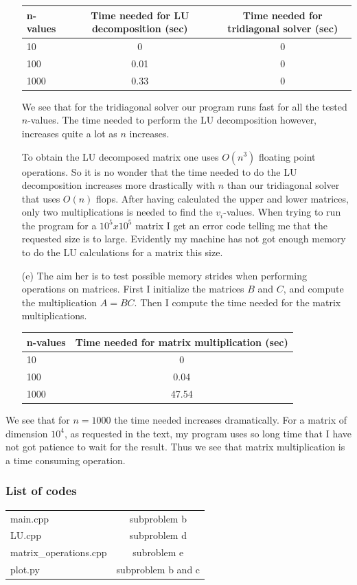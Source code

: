 \documentclass[a4paper,12pt, english]{article}
\begin{document}
\begin{enumerate}
\begin{center}
\begin{tabular}{l | c | c}
n-values & Time needed for LU decomposition (sec) & Time needed for tridiagonal solver (sec) \\ \hline 
10 & 0 & 0 \\ 
100 & 0.01 & 0 \\
1000 & 0.33 & 0 \\
\end{tabular}
\end{center}

We see that for the tridiagonal solver our program runs fast for all the tested $n$-values. The time needed to perform the LU decomposition however, increases quite a lot as $n$ increases. 

To obtain the LU decomposed matrix one uses $O(n^3)$ floating point operations. So it is no wonder that the time needed to do the LU decomposition increases more drastically with $n$ than our tridiagonal solver that uses $O(n)$ flops. After having calculated the upper and lower matrices, only two multiplications is needed to find the $v_{i}$-values. When trying to run the program for a $10^5 x 10^5$ matrix I get an error code telling me that the requested size is to large. Evidently my machine has not got enough memory to do the LU calculations for a matrix this size. 

\item[(e)]
The aim her is to test possible memory strides when performing operations on matrices. First I initialize the matrices $B$ and $C$, and compute the multiplication $A = BC$. Then I compute the time needed for the matrix multiplications.

\begin{center}
\begin{tabular}{l | c}
n-values & Time needed for matrix multiplication (sec) \\ \hline 
10 & 0\\ 
100 & 0.04\\
1000 & 47.54 \\
\end{tabular}
\end{center}
\end{enumerate}


We see that for $n=1000$ the time needed increases dramatically. For a matrix of dimension $10^4$, as requested in the text, my program uses so long time that I have not got patience to wait for the result. Thus we see that matrix multiplication is a time consuming operation. 

\subsubsection*{List of codes}
\begin{center}
\begin{tabular}{l  c}
main.cpp & subproblem b \\
LU.cpp & subproblem d \\
matrix\_operations.cpp &  subroblem e \\
plot.py & subproblem b and c \\
\end{tabular}
\end{center}
\end{document}
